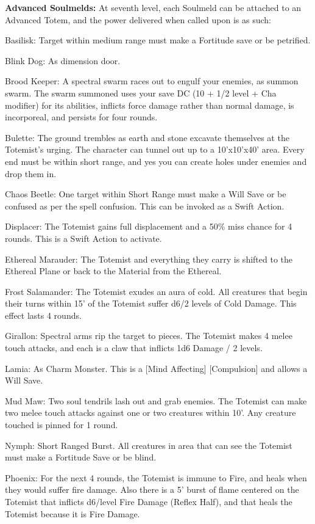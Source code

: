 \textbf{Advanced Soulmelds:} At seventh level, each Soulmeld can be attached to an Advanced Totem, and the power delivered when called upon is as such: 
\begin{itemize*}
\item Basilisk: Target within medium range must make a Fortitude save or be petrified. 
\item Blink Dog: As dimension door. 
\item Brood Keeper: A spectral swarm races out to engulf your enemies, as summon swarm. The swarm summoned uses your save DC (10 + 1/2 level + Cha modifier) for its abilities, inflicts force damage rather than normal damage, is incorporeal, and persists for four rounds. 
\item Bulette: The ground trembles as earth and stone excavate themselves at the Totemist's urging. The character can tunnel out up to a 10'x10'x40' area. Every end must be within short range, and yes you can create holes under enemies and drop them in. 
\item Chaos Beetle: One target within Short Range must make a Will Save or be confused as per the spell confusion. This can be invoked as a Swift Action. 
\item Displacer: The Totemist gains full displacement and a 50\% miss chance for 4 rounds. This is a Swift Action to activate. 
\item Ethereal Marauder: The Totemist and everything they carry is shifted to the Ethereal Plane or back to the Material from the Ethereal. 
\item Frost Salamander: The Totemist exudes an aura of cold. All creatures that begin their turns within 15' of the Totemist suffer d6/2 levels of Cold Damage. This effect lasts 4 rounds. 
\item Girallon: Spectral arms rip the target to pieces. The Totemist makes 4 melee touch attacks, and each is a claw that inflicts 1d6 Damage / 2 levels. 
\item Lamia: As Charm Monster. This is a [Mind Affecting] [Compulsion] and allows a Will Save. 
\item Mud Maw: Two soul tendrils lash out and grab enemies. The Totemist can make two melee touch attacks against one or two creatures within 10'. Any creature touched is pinned for 1 round. 
\item Nymph: Short Ranged Burst. All creatures in area that can see the Totemist must make a Fortitude Save or be blind. 
\item Phoenix: For the next 4 rounds, the Totemist is immune to Fire, and heals when they would suffer fire damage. Also there is a 5' burst of flame centered on the Totemist that inflicts d6/level Fire Damage (Reflex Half), and that heals the Totemist because it is Fire Damage. 

\end{itemize*}

